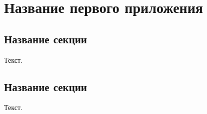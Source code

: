 
\chapter{Название первого приложения}
\label{app1}

\section{Название секции}
\label{app1:sec1}

Текст.

\section{Название секции}
\label{app1:sec2}

Текст.

